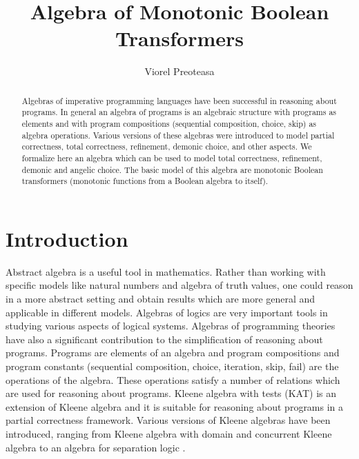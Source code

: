 \documentclass[11pt,a4paper]{article}
\begin{document}
\title{Algebra of Monotonic Boolean Transformers}
\author{Viorel Preoteasa}
\maketitle
\begin{abstract}
Algebras of imperative programming languages have 
been successful in reasoning about programs. In general an 
algebra of programs is an algebraic structure with programs 
as elements and with program compositions (sequential composition, 
choice, skip) as algebra operations. Various versions of these 
algebras were introduced to model partial correctness, total 
correctness, refinement, demonic choice, and other aspects. 
We formalize here an algebra which can be used to model total
correctness, refinement, demonic and angelic choice. The basic 
model of this algebra are monotonic Boolean transformers (monotonic 
functions from a Boolean algebra to itself).
\end{abstract}

\tableofcontents

\section{Introduction}

Abstract algebra is a useful tool in mathematics. Rather than working with 
specific models like natural numbers and algebra of truth values, one could 
reason in a more abstract setting and obtain results which are more general 
and applicable in different models. Algebras of logics are very important 
tools in studying various aspects of logical systems. Algebras of programming 
theories have also a significant contribution to the simplification of 
reasoning about programs. Programs are elements of an algebra and program 
compositions and program constants (sequential composition, choice, iteration, 
skip, fail) are the operations of the algebra. These operations satisfy a number 
of relations which are used for reasoning about programs. Kleene algebra with 
tests (KAT) \cite{kozen:1997} is an extension of Kleene algebra and it is suitable 
for reasoning about programs in a partial correctness framework. Various 
versions of Kleene algebras have been introduced, ranging from Kleene algebra 
with domain \cite{desharnais:moller:struth:2006} and concurrent Kleene algebra 
\cite{hoare:moller:struth:wehrman:2009} to an algebra for separation logic 
\cite{dang:hofner:moller:2011}. 
\end{document}
